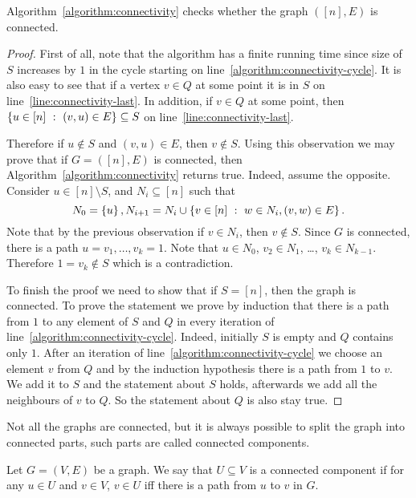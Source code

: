 \begin{theorem}
  Algorithm~\ref{algorithm:connectivity} checks whether the graph $([n], E)$
  is connected.
\end{theorem}
\begin{proof}
  First of all, note that the algorithm has a finite running time since
  size of $S$ increases by $1$ in the cycle starting on
  line~\ref{algorithm:connectivity-cycle}.
  It is also easy to see that if a vertex $v \in Q$ at some point it is
  in $S$ on line~\ref{line:connectivity-last}. In addition, if $v \in Q$
  at some point, then $\set[{(v, u) \in E}]{u \in [n]} \subseteq S$ on
  line~\ref{line:connectivity-last}.

  Therefore if $u \notin S$ and $(v, u) \in E$,
  then $v \notin S$. Using this observation we may prove that
  if $G = ([n], E)$ is connected, then Algorithm~\ref{algorithm:connectivity}
  returns true. Indeed, assume the opposite. Consider $u \in [n] \setminus S$,
  and $N_i \subseteq [n]$ such that \[
    N_0 = \set{u},
    N_{i + 1} = N_i \cup \set[{w \in N_i, (v, w) \in E}]{v \in [n]}.
  \]
  Note that by the previous observation if $v \in N_i$, then $v \notin S$.
  Since $G$ is connected, there is a path $u = v_1, \dots, v_k = 1$.
  Note that $u \in N_0$, $v_2 \in N_1$, \dots, $v_k \in N_{k - 1}$.
  Therefore $1 = v_k \notin S$ which is a contradiction.

  To finish the proof we need to show that if $S = [n]$, then the graph is
  connected. To prove the statement we prove by induction that there is a path
  from $1$ to any element of $S$ and $Q$ in every iteration of
  line~\ref{algorithm:connectivity-cycle}. Indeed, initially $S$ is empty and
  $Q$ contains only $1$. After an iteration of
  line~\ref{algorithm:connectivity-cycle} we choose an element $v$ from $Q$
  and by the induction hypothesis there is a path from $1$ to $v$.
  We add it to $S$ and the statement about $S$ holds, afterwards we
  add all the neighbours of $v$ to $Q$. So the statement about $Q$ is
  also stay true.
\end{proof}

Not all the graphs are connected, but it is always possible to split the
graph into connected parts, such parts are called connected components.
\begin{definition}
  Let $G = (V, E)$ be a graph. We say that $U \subseteq V$ is a connected
  component if for any $u \in U$ and $v \in V$,
  $v \in U$ iff there is a path from $u$ to $v$ in $G$.
\end{definition}

